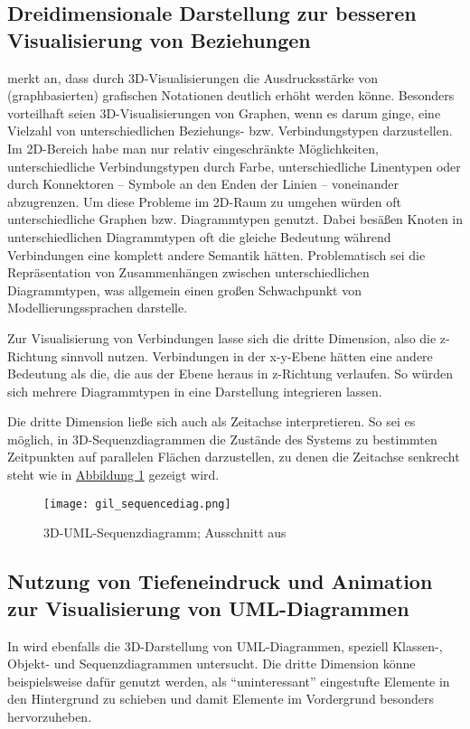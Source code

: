 \documentclass[a4paper,10pt]{sphinxmanual}
\begin{document}
\subsection{Dreidimensionale Darstellung zur besseren Visualisierung von Beziehungen}
\label{related:gil}\label{related:dreidimensionale-darstellung-zur-besseren-visualisierung-von-beziehungen}
\cite{gil_three_1998} merkt an, dass durch 3D-Visualisierungen die Ausdrucksstärke von (graphbasierten) grafischen Notationen deutlich erhöht werden könne.
Besonders vorteilhaft seien 3D-Visualisierungen von Graphen, wenn es darum ginge, eine Vielzahl von unterschiedlichen Beziehungs- bzw. Verbindungstypen darzustellen.
Im 2D-Bereich habe man nur relativ eingeschränkte Möglichkeiten, unterschiedliche Verbindungstypen durch Farbe, unterschiedliche Linentypen oder durch Konnektoren – Symbole an den Enden der Linien – voneinander abzugrenzen.
Um diese Probleme im 2D-Raum zu umgehen würden oft unterschiedliche Graphen bzw. Diagrammtypen genutzt.
Dabei besäßen Knoten in unterschiedlichen Diagrammtypen oft die gleiche Bedeutung während Verbindungen eine komplett andere Semantik hätten.
Problematisch sei die Repräsentation von Zusammenhängen zwischen unterschiedlichen Diagrammtypen, was allgemein einen großen Schwachpunkt von Modellierungssprachen darstelle.

Zur Visualisierung von Verbindungen lasse sich die dritte Dimension, also die z-Richtung sinnvoll nutzen.
Verbindungen in der x-y-Ebene hätten eine andere Bedeutung als die, die aus der Ebene heraus in z-Richtung verlaufen. So würden sich mehrere Diagrammtypen in eine Darstellung integrieren lassen.

Die dritte Dimension ließe sich auch als Zeitachse interpretieren.
So sei es möglich, in 3D-Sequenzdiagrammen die Zustände des Systems zu bestimmten Zeitpunkten auf parallelen Flächen darzustellen, zu denen die Zeitachse senkrecht steht wie in \hyperref[related:gil-sequencediag]{Abbildung  \ref*{related:gil-sequencediag}} gezeigt wird.
\begin{figure}[htbp]
\centering
\capstart

\texttt{[image: gil\_sequencediag.png]}
\caption{3D-UML-Sequenzdiagramm; Ausschnitt aus \cite{gil_three_1998}}\label{related:gil-sequencediag}\end{figure}


\subsection{Nutzung von Tiefeneindruck und Animation zur Visualisierung von UML-Diagrammen}
\label{related:gogolla}\label{related:nutzung-von-tiefeneindruck-und-animation-zur-visualisierung-von-uml-diagrammen}
In \cite{gogolla_towards_1999} wird ebenfalls die 3D-Darstellung von UML-Diagrammen, speziell Klassen-, Objekt- und Sequenzdiagrammen untersucht.
Die dritte Dimension könne beispielsweise dafür genutzt werden, als "`uninteressant"' eingestufte Elemente in den Hintergrund zu schieben und damit Elemente im Vordergrund besonders hervorzuheben.
\end{document}
